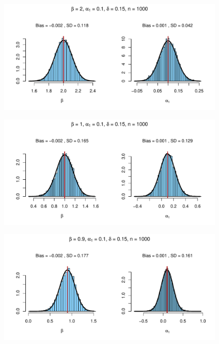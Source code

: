 \documentclass{beamer}
\begin{document}
\begin{frame}[plain,c]

  \begin{figure}[h]
    \centering
    \includegraphics[width=\textwidth]{Rplot2}
  \end{figure}

\end{frame}
\begin{frame}[plain,c]

  \begin{figure}[h]
    \centering
    \includegraphics[width=\textwidth]{Rplot4}
  \end{figure}

\end{frame}
\begin{frame}[plain,c]

  \begin{figure}[h]
    \centering
    \includegraphics[width=\textwidth]{Rplot5}
  \end{figure}

\end{frame}
\end{document}
